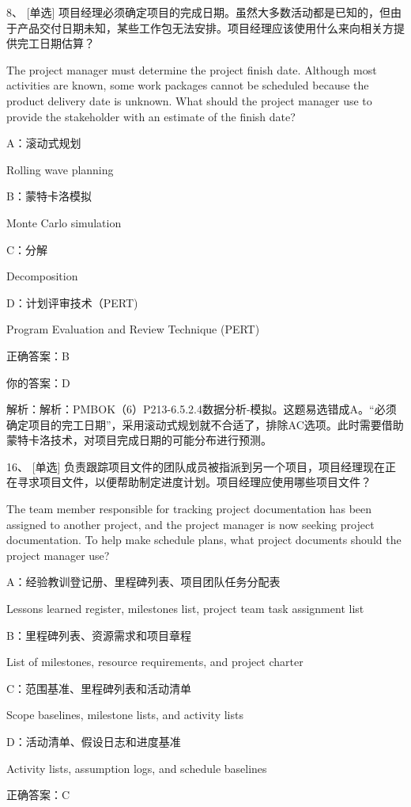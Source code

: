 8、 [单选] 项目经理必须确定项目的完成日期。虽然大多数活动都是已知的，但由于产品交付日期未知，某些工作包无法安排。项目经理应该使用什么来向相关方提供完工日期估算？

The project manager must determine the project finish date. Although most activities are known, some work packages cannot be scheduled because the product delivery date is unknown. What should the project manager use to provide the stakeholder with an estimate of the finish date?

A：滚动式规划

Rolling wave planning

B：蒙特卡洛模拟

Monte Carlo simulation

C：分解

Decomposition

D：计划评审技术（PERT)

Program Evaluation and Review Technique (PERT)

正确答案：B

你的答案：D

解析：解析：PMBOK（6）P213-6.5.2.4数据分析-模拟。这题易选错成A。“必须确定项目的完工日期”，采用滚动式规划就不合适了，排除AC选项。此时需要借助蒙特卡洛技术，对项目完成日期的可能分布进行预测。



16、 [单选] 负责跟踪项目文件的团队成员被指派到另一个项目，项目经理现在正在寻求项目文件，以便帮助制定进度计划。项目经理应使用哪些项目文件？

The team member responsible for tracking project documentation has been assigned to another project, and the project manager is now seeking project documentation. To help make schedule plans, what project documents should the project manager use?

A：经验教训登记册、里程碑列表、项目团队任务分配表

Lessons learned register, milestones list, project team task assignment list

B：里程碑列表、资源需求和项目章程

List of milestones, resource requirements, and project charter

C：范围基准、里程碑列表和活动清单

Scope baselines, milestone lists, and activity lists

D：活动清单、假设日志和进度基准

Activity lists, assumption logs, and schedule baselines

正确答案：C

